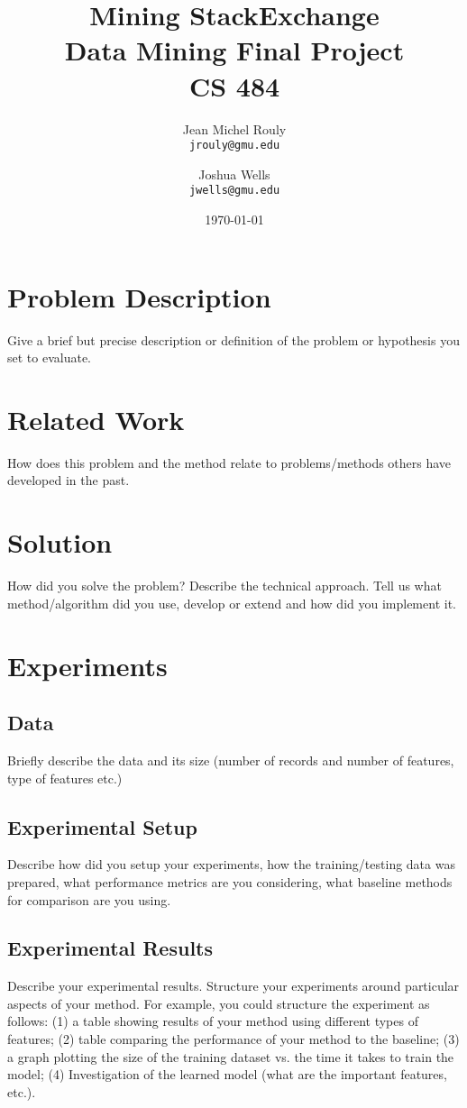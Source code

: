 \documentclass[letterpaper,10pt]{article}
\title{
  \Huge\textbf{Mining StackExchange} \\
  \LARGE Data Mining Final Project \\
  CS 484 \\
}
\author{
  Jean Michel Rouly\\
  \texttt{jrouly@gmu.edu}
  \and
  Joshua Wells\\
  \texttt{jwells@gmu.edu}
}
\date{\today}
\begin{document}
\maketitle


  \section{Problem Description}

  Give a brief but precise description or definition of the problem or
  hypothesis you set to evaluate.


  \section{Related Work}

  How does this problem and the method relate to problems/methods others
  have developed in the past.


  \section{Solution}

  How did you solve the problem? Describe the technical approach. Tell us
  what method/algorithm did you use, develop or extend and how did you
  implement it.


  \section{Experiments}

  \subsection{Data} Briefly describe the data and its size (number of
  records and number of features, type of features etc.)

  \subsection{Experimental Setup} Describe how did you setup your
  experiments, how the training/testing data was prepared, what performance
  metrics are you considering, what baseline methods for comparison are you
  using.

  \subsection{Experimental Results} Describe your experimental results.
  Structure your experiments around particular aspects of your method. For
  example, you could structure the experiment as follows: (1) a table
  showing results of your method using different types of features; (2)
  table comparing the performance of your method to the baseline; (3) a
  graph plotting the size of the training dataset vs. the time it takes to
  train the model; (4) Investigation of the learned model (what are the
  important features, etc.). \cite{santos2009}
\end{document}
